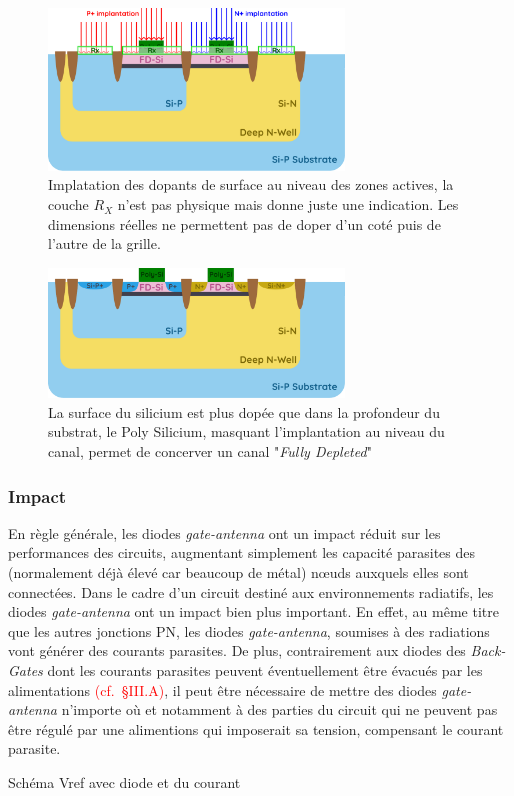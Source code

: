 \begin{figure}[H]
  \centering
  \includegraphics[width=0.7\textwidth]{figures/FabSOI-MiddleEND-3.5.pdf}
  \caption{Implatation des dopants de surface au niveau des zones actives, la couche $R_X$ n'est pas physique mais donne juste une indication. Les dimensions réelles ne permettent pas de doper d'un coté puis de l'autre de la grille.}
  \label{fig:process fdsoi 3}
\end{figure}


\begin{figure}[H]
  \centering
  \includegraphics[width=0.7\textwidth]{figures/FabSOI-MiddleEND-4.pdf}
  \caption{La surface du silicium est plus dopée que dans la profondeur du substrat, le Poly Silicium, masquant l'implantation au niveau du canal, permet de concerver un canal "\textit{Fully Depleted}"}
  \label{fig:process fdsoi 4}
\end{figure}

\subsubsection{Impact}
En règle générale, les diodes \textit{gate-antenna} ont un impact réduit sur les performances des circuits, augmentant simplement les capacité parasites des (normalement déjà élevé car beaucoup de métal) nœuds auxquels elles sont connectées. Dans le cadre d’un circuit destiné aux environnements radiatifs, les diodes \textit{gate-antenna} ont un impact bien plus important. En effet, au même titre que les autres jonctions PN, les diodes \textit{gate-antenna}, soumises à des radiations vont générer des courants parasites. De plus, contrairement aux diodes des \textit{Back-Gates} dont les courants parasites peuvent éventuellement être évacués par les alimentations \textcolor{red}{(cf. §III.A)}, il peut être nécessaire de mettre des diodes \textit{gate-antenna} n’importe où et notamment à des parties du circuit qui ne peuvent pas être régulé par une alimentions qui imposerait sa tension, compensant le courant parasite.
\begin{metsUneSource}
  Schéma Vref avec diode et du courant
\end{metsUneSource}

